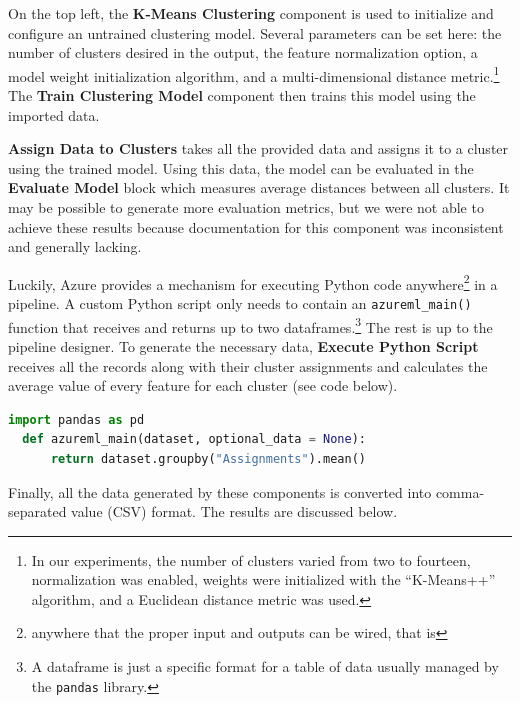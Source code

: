 On the top left, the {\bf K-Means Clustering} component is used to initialize and configure an untrained clustering model. Several parameters can be set here: the number of clusters desired in the output, the feature normalization option, a model weight initialization algorithm, and a multi-dimensional distance metric.\footnote{In our experiments, the number of clusters varied from two to fourteen, normalization was enabled, weights were initialized with the ``K-Means++'' algorithm, and a Euclidean distance metric was used.} The {\bf Train Clustering Model} component then trains this model using the imported data.

  {\bf Assign Data to Clusters} takes all the provided data and assigns it to a cluster using the trained model. Using this data, the model can be evaluated in the {\bf Evaluate Model} block which measures average distances between all clusters. It may be possible to generate more evaluation metrics, but we were not able to achieve these results because documentation for this component was inconsistent and generally lacking.

Luckily, Azure provides a mechanism for executing Python code anywhere\footnote{anywhere that the proper input and outputs can be wired, that is} in a pipeline. A custom Python script only needs to contain an \lstinline{azureml_main()} function that receives and returns up to two dataframes.\footnote{A dataframe is just a specific format for a table of data usually managed by the \lstinline{pandas} library.} The rest is up to the pipeline designer. To generate the necessary data, {\bf Execute Python Script} receives all the records along with their cluster assignments and calculates the average value of every feature for each cluster (see code below).
\begin{lstlisting}[language=Python]
  import pandas as pd
  def azureml_main(dataset, optional_data = None):
      return dataset.groupby("Assignments").mean()
\end{lstlisting}

Finally, all the data generated by these components is converted into comma-separated value (CSV) format. The results are discussed below.

